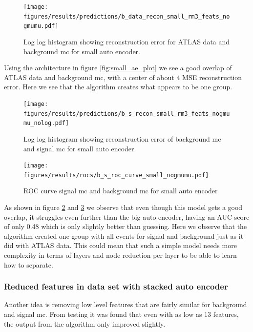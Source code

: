\documentclass[ reprint, amsmath,amssymb, aps, nofootinbib]{revtex4-2}
\begin{document}
\begin{figure}[H]
     \centering
         \texttt{[image: figures/results/predictions/b\_data\_recon\_small\_rm3\_feats\_nogmumu.pdf]}
         \caption{Log log histogram showing reconstruction error for ATLAS data and background mc for small auto encoder. }
     \label{fig:data_b_small_pred}
\end{figure}


Using the architecture in figure \ref{fig:small_ae_plot} we see a good overlap of ATLAS data and background mc, with a center of about 4 MSE reconstruction error. Here we see that the algorithm creates what appears to be one group. 

\begin{figure}[H]    
 \centering
    \texttt{[image: figures/results/predictions/b\_s\_recon\_small\_rm3\_feats\_nogmumu\_nolog.pdf]}
    \caption{Log log histogram showing reconstruction error of background mc and signal mc for small auto encoder. }
    \label{fig:s_b_small_pred_}   
  
\end{figure}

\begin{figure}[H]    
  \centering
         \texttt{[image: figures/results/rocs/b\_s\_roc\_curve\_small\_nogmumu.pdf]}
         \caption{ROC curve signal mc and background mc for small auto encoder}
         \label{fig:s_b_small_roc}  
  
\end{figure}


As shown in figure \ref{fig:s_b_small_pred_} and \ref{fig:s_b_small_roc} we observe that even though this model gets a good overlap, it struggles even further than the big auto encoder, having an AUC score of only 0.48 which is only slightly better than guessing. Here we observe that the algorithm created one group with all events for signal and background just as it did with ATLAS data. This could mean that such a simple model needs more complexity in terms of layers and node reduction per layer to be able to learn how to separate. \par 

\subsubsection{Reduced features in data set with stacked auto encoder}

Another idea is removing low level features that are fairly similar for background and signal mc. From testing it was found that even with as low as 13 features, the output from the algorithm only improved slightly.
\end{document}
